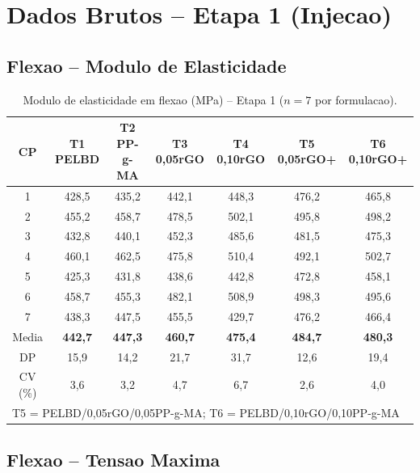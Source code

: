 \documentclass[11pt,a4paper]{article}
\begin{document}
\section{Dados Brutos -- Etapa 1 (Injecao)}

\subsection{Flexao -- Modulo de Elasticidade}

\begin{table}[H]\centering
\caption{Modulo de elasticidade em flexao (MPa) -- Etapa 1 ($n=7$ por formulacao).}\label{tab:mod1}
\begin{tabular}{ccccccc}
\toprule
{\bfseries CP} & {\bfseries T1 PELBD} & {\bfseries T2 PP-g-MA} & {\bfseries T3 0,05rGO} & {\bfseries T4 0,10rGO} & {\bfseries T5 0,05rGO+} & {\bfseries T6 0,10rGO+} \\
\midrule
1 & 428,5 & 435,2 & 442,1 & 448,3 & 476,2 & 465,8 \\
2 & 455,2 & 458,7 & 478,5 & 502,1 & 495,8 & 498,2 \\
3 & 432,8 & 440,1 & 452,3 & 485,6 & 481,5 & 475,3 \\
4 & 460,1 & 462,5 & 475,8 & 510,4 & 492,1 & 502,7 \\
5 & 425,3 & 431,8 & 438,6 & 442,8 & 472,8 & 458,1 \\
6 & 458,7 & 455,3 & 482,1 & 508,9 & 498,3 & 495,6 \\
7 & 438,3 & 447,5 & 455,5 & 429,7 & 476,2 & 466,4 \\
\midrule
Media & {\bfseries 442,7} & {\bfseries 447,3} & {\bfseries 460,7} & {\bfseries 475,4} & {\bfseries 484,7} & {\bfseries 480,3} \\
DP & 15,9 & 14,2 & 21,7 & 31,7 & 12,6 & 19,4 \\
CV (\%) & 3,6 & 3,2 & 4,7 & 6,7 & 2,6 & 4,0 \\
\bottomrule
\multicolumn{7}{l}{T5 = PELBD/0,05rGO/0,05PP-g-MA; T6 = PELBD/0,10rGO/0,10PP-g-MA} \\
\end{tabular}
\end{table}

\subsection{Flexao -- Tensao Maxima}
\end{document}

